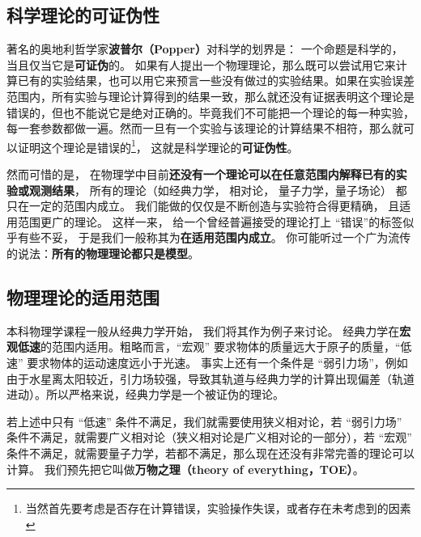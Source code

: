 

\subsection{科学理论的可证伪性}

著名的奥地利哲学家\textbf{波普尔（Popper）}对科学的划界是： 一个命题是科学的， 当且仅当它是\textbf{可证伪}的。 如果有人提出一个物理理论，那么既可以尝试用它来计算已有的实验结果，也可以用它来预言一些没有做过的实验结果。如果在实验误差范围内，所有实验与理论计算得到的结果一致，那么就还没有证据表明这个理论是错误的，但也不能说它是绝对正确的。毕竟我们不可能把一个理论的每一种实验，每一套参数都做一遍。然而一旦有一个实验与该理论的计算结果不相符，那么就可以证明这个理论是错误的\footnote{当然首先要考虑是否存在计算错误，实验操作失误，或者存在未考虑到的因素}， 这就是科学理论的\textbf{可证伪性}。

然而可惜的是， 在物理学中目前\textbf{还没有一个理论可以在任意范围内解释已有的实验或观测结果}， 所有的理论（如经典力学， 相对论， 量子力学，量子场论） 都只在一定的范围内成立。 我们能做的仅仅是不断创造与实验符合得更精确， 且适用范围更广的理论。 这样一来， 给一个曾经普遍接受的理论打上 “错误”的标签似乎有些不妥， 于是我们一般称其为\textbf{在适用范围内成立}。 你可能听过一个广为流传的说法：\textbf{所有的物理理论都只是模型}。

\subsection{物理理论的适用范围}
本科物理学课程一般从经典力学开始， 我们将其作为例子来讨论。 经典力学在\textbf{宏观低速}的范围内适用。粗略而言，“宏观” 要求物体的质量远大于原子的质量，“低速” 要求物体的运动速度远小于光速。 事实上还有一个条件是 “弱引力场”，例如由于水星离太阳较近，引力场较强，导致其轨道与经典力学的计算出现偏差（轨道进动）。所以严格来说，经典力学是一个被证伪的理论。

若上述中只有 “低速” 条件不满足，我们就需要使用狭义相对论，若 “弱引力场” 条件不满足，就需要广义相对论（狭义相对论是广义相对论的一部分），若 “宏观” 条件不满足，就需要量子力学，若都不满足，那么现在还没有非常完善的理论可以计算。 我们预先把它叫做\textbf{万物之理（theory of everything，TOE）}。

